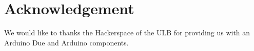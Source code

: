 \section{Acknowledgement}

We would like to thanks the Hackerspace of the ULB for providing us with an Arduino Due and Arduino components.